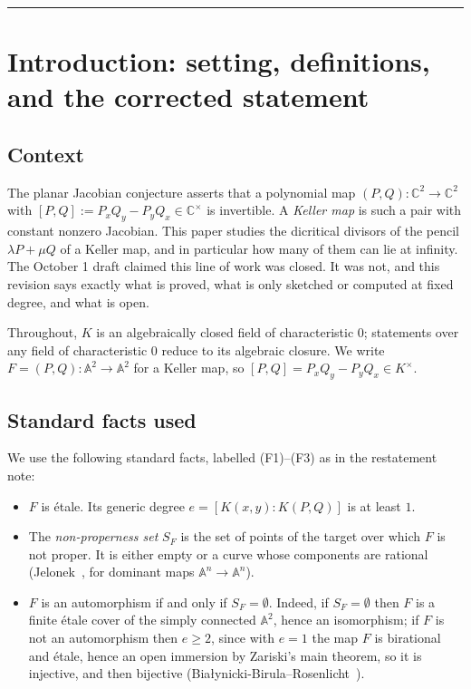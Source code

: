 \documentclass[a4paper,11pt]{article}
\theoremstyle{plain}
\theoremstyle{definition}
\theoremstyle{remark}
\begin{document}
\vspace{1.2cm}
\hrule
\vspace{1.4cm}

\section{Introduction: setting, definitions, and the corrected statement}\label{sec:statement}

\subsection{Context}

The planar Jacobian conjecture asserts that a polynomial map
$(P,Q) \colon \mathbb{C}^2 \to \mathbb{C}^2$ with
$[P,Q] := P_x Q_y - P_y Q_x \in \mathbb{C}^\times$ is invertible. A \emph{Keller map} is
such a pair with constant nonzero Jacobian. This paper studies the dicritical divisors of the
pencil $\lambda P + \mu Q$ of a Keller map, and in particular how many of them can lie at
infinity. The October 1 draft claimed this line of work was closed. It was not, and this
revision says exactly what is proved, what is only sketched or computed at fixed degree, and
what is open.

Throughout, $K$ is an algebraically closed field of characteristic $0$; statements over any
field of characteristic $0$ reduce to its algebraic closure. We write
$F = (P,Q) \colon \mathbb{A}^2 \to \mathbb{A}^2$ for a Keller map, so
$[P,Q] = P_x Q_y - P_y Q_x \in K^\times$.

\subsection{Standard facts used}

We use the following standard facts, labelled (F1)--(F3) as in the restatement note:
\begin{itemize}[nosep]
\item[(F1)] $F$ is \'{e}tale. Its generic degree $e = [K(x,y) : K(P,Q)]$ is at least $1$.
\item[(F2)] The \emph{non-properness set} $S_F$ is the set of points of the target over which
$F$ is not proper. It is either empty or a curve whose components are rational
(Jelonek~\cite{Jelonek1993}, for dominant maps $\mathbb{A}^n \to \mathbb{A}^n$).
\item[(F3)] $F$ is an automorphism if and only if $S_F = \emptyset$. Indeed, if
$S_F = \emptyset$ then $F$ is a finite \'{e}tale cover of the simply connected
$\mathbb{A}^2$, hence an isomorphism; if $F$ is not an automorphism then $e \geq 2$, since
with $e = 1$ the map $F$ is birational and \'{e}tale, hence an open immersion by Zariski's
main theorem, so it is injective, and then bijective
(Bia\l{}ynicki-Birula--Rosenlicht~\cite{BBR1962}).
\end{itemize}
\end{document}
